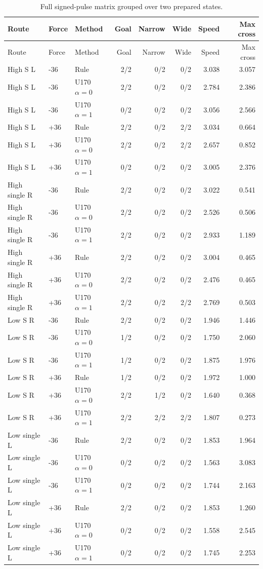 \documentclass[11pt,a4paper]{article}
\begin{document}
\begin{longtable}{lllrrrrr}
\caption{Full signed-pulse matrix grouped over two prepared states.\label{tab:pulse}}\\
\toprule
Route & Force & Method & Goal & Narrow & Wide & Speed & Max cross \\
\midrule
\endfirsthead
\toprule
Route & Force & Method & Goal & Narrow & Wide & Speed & Max cross \\
\midrule
\endhead
High S L & -36 & Rule & 2/2 & 0/2 & 0/2 & 3.038 & 3.057 \\
High S L & -36 & U170 $\alpha=0$ & 2/2 & 0/2 & 0/2 & 2.784 & 2.386 \\
High S L & -36 & U170 $\alpha=1$ & 0/2 & 0/2 & 0/2 & 3.056 & 2.566 \\
High S L & +36 & Rule & 2/2 & 0/2 & 2/2 & 3.034 & 0.664 \\
High S L & +36 & U170 $\alpha=0$ & 2/2 & 0/2 & 2/2 & 2.657 & 0.852 \\
High S L & +36 & U170 $\alpha=1$ & 0/2 & 0/2 & 0/2 & 3.005 & 2.376 \\
High single R & -36 & Rule & 2/2 & 0/2 & 0/2 & 3.022 & 0.541 \\
High single R & -36 & U170 $\alpha=0$ & 2/2 & 0/2 & 0/2 & 2.526 & 0.506 \\
High single R & -36 & U170 $\alpha=1$ & 2/2 & 0/2 & 0/2 & 2.933 & 1.189 \\
High single R & +36 & Rule & 2/2 & 0/2 & 0/2 & 3.004 & 0.465 \\
High single R & +36 & U170 $\alpha=0$ & 2/2 & 0/2 & 0/2 & 2.476 & 0.465 \\
High single R & +36 & U170 $\alpha=1$ & 2/2 & 0/2 & 2/2 & 2.769 & 0.503 \\
Low S R & -36 & Rule & 2/2 & 0/2 & 0/2 & 1.946 & 1.446 \\
Low S R & -36 & U170 $\alpha=0$ & 1/2 & 0/2 & 0/2 & 1.750 & 2.060 \\
Low S R & -36 & U170 $\alpha=1$ & 1/2 & 0/2 & 0/2 & 1.875 & 1.976 \\
Low S R & +36 & Rule & 1/2 & 0/2 & 0/2 & 1.972 & 1.000 \\
Low S R & +36 & U170 $\alpha=0$ & 2/2 & 1/2 & 0/2 & 1.640 & 0.368 \\
Low S R & +36 & U170 $\alpha=1$ & 2/2 & 2/2 & 2/2 & 1.807 & 0.273 \\
Low single L & -36 & Rule & 2/2 & 0/2 & 0/2 & 1.853 & 1.964 \\
Low single L & -36 & U170 $\alpha=0$ & 0/2 & 0/2 & 0/2 & 1.563 & 3.083 \\
Low single L & -36 & U170 $\alpha=1$ & 0/2 & 0/2 & 0/2 & 1.744 & 2.163 \\
Low single L & +36 & Rule & 2/2 & 0/2 & 0/2 & 1.853 & 1.260 \\
Low single L & +36 & U170 $\alpha=0$ & 0/2 & 0/2 & 0/2 & 1.558 & 2.545 \\
Low single L & +36 & U170 $\alpha=1$ & 0/2 & 0/2 & 0/2 & 1.745 & 2.253 \\
\bottomrule
\end{longtable}
\end{document}
